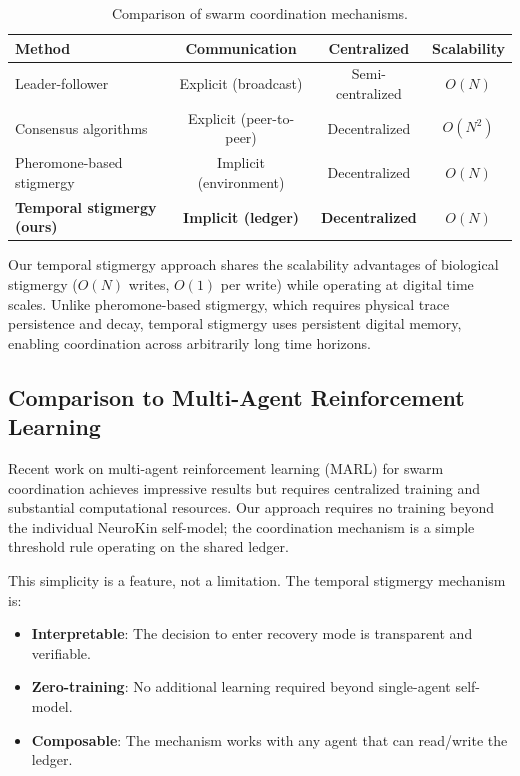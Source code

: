 \documentclass[12pt,a4paper,oneside]{report}
\begin{document}
\begin{table}[H]
\centering
\caption{Comparison of swarm coordination mechanisms.}
\label{tab:swarm_comparison_lit}
\begin{tabular}{lccc}
\toprule
\textbf{Method} & \textbf{Communication} & \textbf{Centralized} & \textbf{Scalability} \\
\midrule
Leader-follower & Explicit (broadcast) & Semi-centralized & $O(N)$ \\
Consensus algorithms & Explicit (peer-to-peer) & Decentralized & $O(N^2)$ \\
Pheromone-based stigmergy & Implicit (environment) & Decentralized & $O(N)$ \\
\textbf{Temporal stigmergy (ours)} & \textbf{Implicit (ledger)} & \textbf{Decentralized} & \textbf{$O(N)$} \\
\bottomrule
\end{tabular}
\end{table}

Our temporal stigmergy approach shares the scalability advantages of biological stigmergy ($O(N)$ writes, $O(1)$ per write) while operating at digital time scales. Unlike pheromone-based stigmergy, which requires physical trace persistence and decay, temporal stigmergy uses persistent digital memory, enabling coordination across arbitrarily long time horizons.

\subsection{Comparison to Multi-Agent Reinforcement Learning}

Recent work on multi-agent reinforcement learning (MARL) for swarm coordination \cite{domberg2026selfadapting, daneshmand2026slowrl} achieves impressive results but requires centralized training and substantial computational resources. Our approach requires no training beyond the individual NeuroKin self-model; the coordination mechanism is a simple threshold rule operating on the shared ledger.

This simplicity is a feature, not a limitation. The temporal stigmergy mechanism is:
\begin{itemize}
    \item \textbf{Interpretable}: The decision to enter recovery mode is transparent and verifiable.
    \item \textbf{Zero-training}: No additional learning required beyond single-agent self-model.
    \item \textbf{Composable}: The mechanism works with any agent that can read/write the ledger.
\end{itemize}
\end{document}
